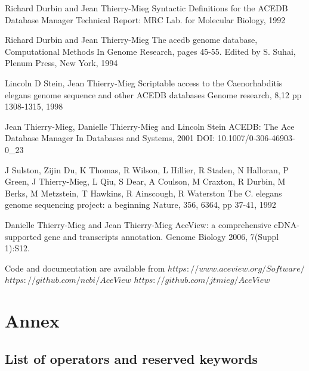 \documentclass[11pt]{article}
\begin{document}
\begin{thebibliography}{99}

Richard Durbin and Jean Thierry-Mieg
Syntactic Definitions for the ACEDB Database Manager
Technical Report: MRC Lab. for Molecular Biology, 1992

Richard Durbin and Jean Thierry-Mieg
The acedb genome database,
Computational Methods In Genome Research, pages 45-55.
Edited by S. Suhai, Plenum Press, New York, 1994

Lincoln D Stein, Jean Thierry-Mieg
Scriptable access to the Caenorhabditis elegans genome sequence and other ACEDB databases
Genome research, 8,12 pp 1308-1315, 1998

Jean Thierry-Mieg, Danielle Thierry-Mieg and Lincoln Stein
ACEDB: The Ace Database Manager
In Databases and Systems, 2001
DOI: 10.1007/0-306-46903-0\_23


J Sulston, Zijin Du, K Thomas, R Wilson, L Hillier, R Staden, N Halloran, P Green, J Thierry-Mieg, L Qiu, S Dear, A Coulson, M Craxton, R Durbin, M Berks, M Metzstein, T Hawkins, R Ainscough, R Waterston
The C. elegans genome sequencing project: a beginning
Nature, 356, 6364, pp 37-41, 1992


Danielle Thierry-Mieg and Jean Thierry-Mieg
AceView: a comprehensive cDNA-supported gene and transcripts annotation.
Genome Biology 2006, 7(Suppl 1):S12.  

Code and documentation are available from  
$https://www.aceview.org/Software/$ 
$https://github.com/ncbi/AceView$ 
$https://github.com/jtmieg/AceView$ 


\end{thebibliography}


\appendix
\section {Annex}
\subsection{List of operators and reserved keywords}
\end{document}
